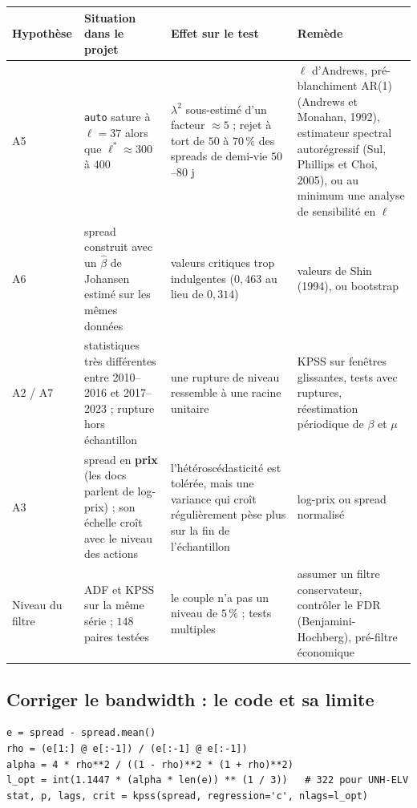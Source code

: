 \documentclass[11pt,a4paper]{article}
\newcommand{\code}[1]{\texttt{#1}}
\theoremstyle{definition}
\begin{document}
\begin{center}
\small
\begin{tabularx}{\textwidth}{@{}>{\raggedright}p{2.1cm}>{\raggedright}X>{\raggedright}X>{\raggedright\arraybackslash}X@{}}
\toprule
Hypothèse & Situation dans le projet & Effet sur le test & Remède \\
\midrule
A5 & \code{auto} sature à $\ell = 37$ alors que $\ell^* \approx 300$ à $400$ & $\lambda^2$ sous-estimé d'un facteur $\approx 5$ ; rejet à tort de $50$ à $70\,\%$ des spreads de demi-vie $50$--$80$ j & $\ell$ d'Andrews, pré-blanchiment AR(1) (Andrews et Monahan, 1992), estimateur spectral autorégressif (Sul, Phillips et Choi, 2005), ou au minimum une analyse de sensibilité en $\ell$ \\
\addlinespace
A6 & spread construit avec un $\hat\beta$ de Johansen estimé sur les mêmes données & valeurs critiques trop indulgentes ($0{,}463$ au lieu de $0{,}314$) & valeurs de Shin (1994), ou bootstrap \\
\addlinespace
A2 / A7 & statistiques très différentes entre 2010--2016 et 2017--2023 ; rupture hors échantillon & une rupture de niveau ressemble à une racine unitaire & KPSS sur fenêtres glissantes, tests avec ruptures, réestimation périodique de $\beta$ et $\mu$ \\
\addlinespace
A3 & spread en \textbf{prix} (les docs parlent de log-prix) ; son échelle croît avec le niveau des actions & l'hétéroscédasticité est tolérée, mais une variance qui croît régulièrement pèse plus sur la fin de l'échantillon & log-prix ou spread normalisé \\
\addlinespace
Niveau du filtre & ADF et KPSS sur la même série ; $148$ paires testées & le couple n'a pas un niveau de $5\,\%$ ; tests multiples & assumer un filtre conservateur, contrôler le FDR (Benjamini-Hochberg), pré-filtre économique \\
\bottomrule
\end{tabularx}
\end{center}

\subsection{Corriger le bandwidth : le code et sa limite}

\begin{lstlisting}
e = spread - spread.mean()
rho = (e[1:] @ e[:-1]) / (e[:-1] @ e[:-1])
alpha = 4 * rho**2 / ((1 - rho)**2 * (1 + rho)**2)
l_opt = int(1.1447 * (alpha * len(e)) ** (1 / 3))   # 322 pour UNH-ELV
stat, p, lags, crit = kpss(spread, regression='c', nlags=l_opt)
\end{lstlisting}
\end{document}
